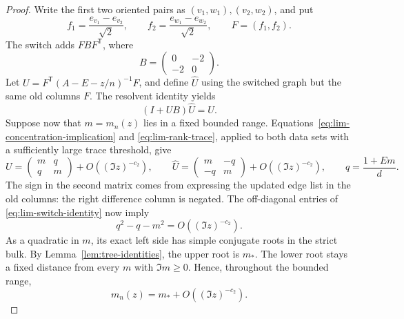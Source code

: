 \begin{proof}
Write the first two oriented pairs as \((v_1,w_1),(v_2,w_2)\), and put
\[
 f_1=\frac{e_{v_1}-e_{v_2}}{\sqrt2},\qquad
 f_2=\frac{e_{w_1}-e_{w_2}}{\sqrt2},\qquad F=(f_1,f_2).
\]
The switch adds \(F B F^{\mathsf T}\), where
\[
 B=\begin{pmatrix}0&-2\\-2&0\end{pmatrix}.
\]
Let \(U=F^{\mathsf T}(A-E-z/n)^{-1}F\), and define \(\widehat U\) using
the switched graph but the same old columns \(F\). The resolvent
identity yields
\begin{equation}\label{eq:lim-switch-identity}
 (I+UB)\widehat U=U.
\end{equation}
Suppose now that \(m=m_n(z)\) lies in a fixed bounded range.
Equations~\eqref{eq:lim-concentration-implication} and
\eqref{eq:lim-rank-trace}, applied to both data sets with a sufficiently
large trace threshold, give
\begin{equation}\label{eq:lim-switch-compressions}
 U=\begin{pmatrix}m&q\\q&m\end{pmatrix}
       +O((\Im z)^{-c_2}),\qquad
 \widehat U=\begin{pmatrix}m&-q\\-q&m\end{pmatrix}
       +O((\Im z)^{-c_2}),\qquad
 q=\frac{1+E m}{d}.
\end{equation}
The sign in the second matrix comes from expressing the updated edge
list in the old columns: the right difference column is negated.
The off-diagonal entries of \eqref{eq:lim-switch-identity} now imply
\begin{equation}\label{eq:lim-scalar-equation}
 q^2-q-m^2=O((\Im z)^{-c_2}).
\end{equation}
As a quadratic in \(m\), its exact left side has simple conjugate roots
in the strict bulk. By Lemma~\ref{lem:tree-identities}, the upper root is
\(m_*\). The lower root stays a fixed distance from every \(m\) with
\(\Im m\ge0\). Hence, throughout the bounded range,
\begin{equation}\label{eq:lim-scalar-stability}
 m_n(z)=m_*+O((\Im z)^{-c_2}).
\end{equation}


\end{proof}
